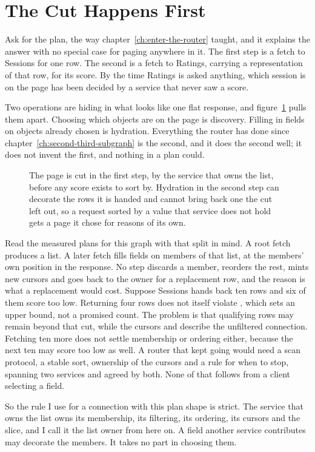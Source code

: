 \section{The Cut Happens First}
\label{sec:ch13-cut-happens-first}

%
Ask for the plan, the way chapter~\ref{ch:enter-the-router} taught, and it
explains the answer with no special case for paging anywhere in it. The first
step is a  fetch to Sessions for one row. The second is a
 fetch to Ratings, carrying a representation of that row,
for its score. By the time Ratings is asked anything, which session is on the
page has been decided by a service that never saw a score.

%
Two operations are hiding in what looks like one flat response, and
figure~\ref{fig:ch13-two-page-orders} pulls them apart. Choosing which objects
are on the page is discovery. Filling in fields on objects already chosen is
hydration. Everything the router has done since
chapter~\ref{ch:second-third-subgraph} is the second, and it does the second
well; it does not invent the first, and nothing in a plan could.

\begin{figure}[htbp]
  \centering
  
  \caption{The page is cut in the first step, by the service that owns the
  list, before any score exists to sort by. Hydration in the second step can
  decorate the rows it is handed and cannot bring back one the cut left out,
  so a request sorted by a value that service does not hold gets a page it
  chose for reasons of its own.}
  \label{fig:ch13-two-page-orders}
\end{figure}

%
Read the measured plans for this graph with that split in mind. A root
 fetch produces a list. A later  fetch fills
fields on members of that list, at the members' own position in the response.
No step discards a member, reorders the rest, mints new cursors and goes
back to the owner for a replacement row, and the reason is what a replacement
would cost. Suppose Sessions hands back ten rows and six of them score too
low. Returning four rows does not itself violate , which
sets an upper bound, not a promised count. The problem is that qualifying rows
may remain beyond that cut, while the cursors and  describe
the unfiltered connection. Fetching ten more does not settle membership or
ordering either, because the next ten may score too low as well. A router that
kept going would need a scan protocol, a stable sort, ownership of the cursors
and a rule for when to stop, spanning two services and agreed by both. None of
that follows from a client selecting a field.

%
So the rule I use for a connection with this plan shape is strict. The service
that owns the list owns its membership, its filtering, its ordering, its
cursors and the slice, and I call it the list owner from here on. A field
another service contributes may decorate the members. It takes no part in
choosing them.
%

